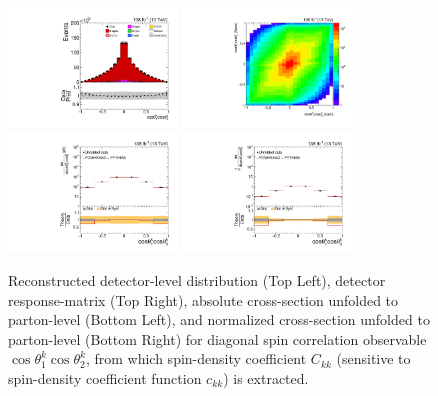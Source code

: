 \clearpage
\begin{figure}[htb]
\begin{center}
 \includegraphics[width=0.40\textwidth]{fig_fullRun2UL/controlplots/combined/Hyp_LLBarCkk.pdf}
 \includegraphics[width=0.40\textwidth]{fig_fullRun2UL/unfolding/combined/ResponseMatrix_c_kk.pdf} \\
 \includegraphics[width=0.40\textwidth]{fig_fullRun2UL/unfolding/combined/UnfoldedResults_c_kk.pdf}
 \includegraphics[width=0.40\textwidth]{fig_fullRun2UL/unfolding/combined/UnfoldedResultsNorm_c_kk.pdf} \\
\label{fig:c_kk}
\caption{Reconstructed detector-level distribution (Top Left), detector response-matrix (Top Right), absolute cross-section unfolded to parton-level (Bottom Left), and normalized cross-section unfolded to parton-level (Bottom Right) for diagonal spin correlation observable $\cos\theta_{1}^{k}\cos\theta_{2}^{k}$, from which spin-density coefficient $C_{kk}$ (sensitive to spin-density coefficient function $c_{k k}$) is extracted.}
\end{center}
\end{figure}
